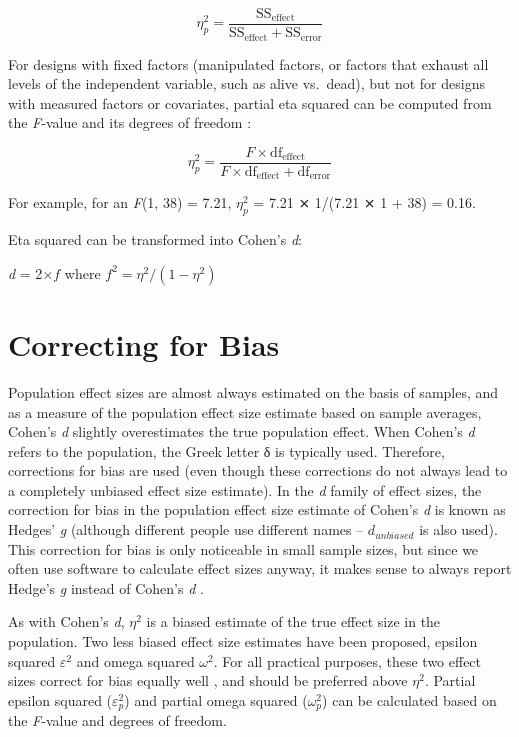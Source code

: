 \documentclass[
  oneside]{book}
\begin{document}
\[\eta_{p}^{2} = \frac{\text{SS}_{\text{effect}}}{\text{SS}_{\text{effect}} + \text{SS}_{\text{error}}}\]

For designs with fixed factors (manipulated factors, or factors that exhaust all levels of the independent variable, such as alive vs.~dead), but not for designs with measured factors or covariates, partial eta squared can be computed from the \emph{F}-value and its degrees of freedom \citep{cohen_statistical_1988}:

\[\eta_{p}^{2} = \frac{F \times \text{df}_{\text{effect}}}{{F \times \text{df}}_{\text{effect}} + \text{df}_{\text{error}}}\]

For example, for an \emph{F}(1, 38) = 7.21, \(\eta_{p}^{2}\) = 7.21 ⨯ 1/(7.21 ⨯ 1 +
38) = 0.16.

Eta squared can be transformed into Cohen's \emph{d}:

\emph{d} = 2\(\times f\) where \(f^{2} = \eta^{2}/(1 - \eta^{2})\)

\hypertarget{correcting-for-bias}{%
\section{Correcting for Bias}\label{correcting-for-bias}}

Population effect sizes are almost always estimated on the basis of samples, and as a measure of the population effect size estimate based on sample averages, Cohen's \emph{d} slightly overestimates the true population effect. When Cohen's \emph{d} refers to the population, the Greek letter δ is typically used. Therefore, corrections for bias are used (even though these corrections do not always lead to a completely unbiased effect size estimate). In the \emph{d} family of effect sizes, the correction for bias in the population effect size estimate of Cohen's \emph{d} is known as Hedges' \emph{g} (although different people use different names -- \(d_{unbiased}\) is also used). This correction for bias is only noticeable in small sample sizes, but since we often use software to calculate effect sizes anyway, it makes sense to always report Hedge's \emph{g} instead of Cohen's \emph{d} \citep{thompson_effect_2007}.

As with Cohen's \emph{d}, \(\eta^2\) is a biased estimate of the true effect size in the population. Two less biased effect size estimates have been proposed, epsilon squared \(\varepsilon^{2}\) and omega squared \(\omega^{2}\). For all practical purposes, these two effect sizes correct for bias equally well \citep{okada_is_2013, albers_when_2018}, and should be preferred above \(\eta^2\). Partial epsilon squared (\(\varepsilon_{p}^{2}\)) and partial omega squared (\(\omega_{p}^{2}\)) can be calculated based on the \emph{F}-value and degrees of freedom.
\end{document}
